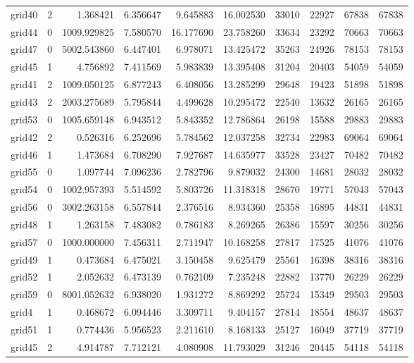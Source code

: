 \begin{longtable}{|l|r|r|r|r|r|r|r|r|r|}
grid40 & 2 & 1.368421 & 6.356647 & 9.645883 & 16.002530 & 33010 & 22927 & 67838 & 67838 \\
grid44 & 0 & 1009.929825 & 7.580570 & 16.177690 & 23.758260 & 33634 & 23292 & 70663 & 70663 \\
grid47 & 0 & 5002.543860 & 6.447401 & 6.978071 & 13.425472 & 35263 & 24926 & 78153 & 78153 \\
grid45 & 1 & 4.756892 & 7.411569 & 5.983839 & 13.395408 & 31204 & 20403 & 54059 & 54059 \\
grid41 & 2 & 1009.050125 & 6.877243 & 6.408056 & 13.285299 & 29648 & 19423 & 51898 & 51898 \\
grid43 & 2 & 2003.275689 & 5.795844 & 4.499628 & 10.295472 & 22540 & 13632 & 26165 & 26165 \\
grid53 & 0 & 1005.659148 & 6.943512 & 5.843352 & 12.786864 & 26198 & 15588 & 29883 & 29883 \\
grid42 & 2 & 0.526316 & 6.252696 & 5.784562 & 12.037258 & 32734 & 22983 & 69064 & 69064 \\
grid46 & 1 & 1.473684 & 6.708290 & 7.927687 & 14.635977 & 33528 & 23427 & 70482 & 70482 \\
grid55 & 0 & 1.097744 & 7.096236 & 2.782796 & 9.879032 & 24300 & 14681 & 28032 & 28032 \\
grid54 & 0 & 1002.957393 & 5.514592 & 5.803726 & 11.318318 & 28670 & 19771 & 57043 & 57043 \\
grid56 & 0 & 3002.263158 & 6.557844 & 2.376516 & 8.934360 & 25358 & 16895 & 44831 & 44831 \\
grid48 & 1 & 1.263158 & 7.483082 & 0.786183 & 8.269265 & 26386 & 15597 & 30256 & 30256 \\
grid57 & 0 & 1000.000000 & 7.456311 & 2.711947 & 10.168258 & 27817 & 17525 & 41076 & 41076 \\
grid49 & 1 & 0.473684 & 6.475021 & 3.150458 & 9.625479 & 25561 & 16398 & 38316 & 38316 \\
grid52 & 1 & 2.052632 & 6.473139 & 0.762109 & 7.235248 & 22882 & 13770 & 26229 & 26229 \\
grid59 & 0 & 8001.052632 & 6.938020 & 1.931272 & 8.869292 & 25724 & 15349 & 29503 & 29503 \\
grid4 & 1 & 0.468672 & 6.094446 & 3.309711 & 9.404157 & 27814 & 18554 & 48637 & 48637 \\
grid51 & 1 & 0.774436 & 5.956523 & 2.211610 & 8.168133 & 25127 & 16049 & 37719 & 37719 \\
grid45 & 2 & 4.914787 & 7.712121 & 4.080908 & 11.793029 & 31246 & 20445 & 54118 & 54118 \\

\end{longtable}

